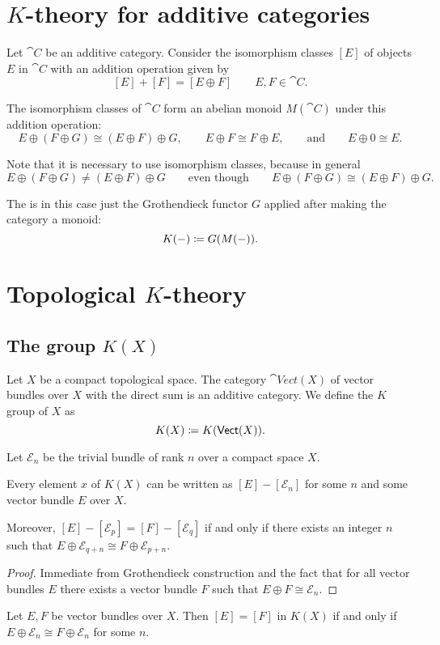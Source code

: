 \chapter{$K$-theory for additive categories}
Let $\cat{C}$ be an additive category. Consider the isomorphism classes $[E]$ of objects $E$ in $\cat{C}$ with an addition operation given by
\[ [E]+[F] = [E\oplus F] \qquad E,F\in \cat{C}. \]
\begin{lemma}
The isomorphism classes of $\cat{C}$ form an abelian monoid $M(\cat{C})$ under this addition operation:
\[ E\oplus (F\oplus G) \cong (E\oplus F)\oplus G, \qquad  E\oplus F \cong F\oplus E, \qquad \text{and}\qquad E\oplus 0 \cong E. \]
\end{lemma}
Note that it is necessary to use isomorphism classes, because in general
\[ E\oplus (F\oplus G) \neq (E\oplus F)\oplus G \qquad \text{even though} \qquad E\oplus (F\oplus G) \cong (E\oplus F)\oplus G. \]
\begin{definition}
The  is in this case just the Grothendieck functor $G$ applied after making the category a monoid:
\[ K(-) \coloneqq G(M(-)). \]
\end{definition}


\chapter{Topological $K$-theory}
\section{The group $K(X)$}
\begin{definition}
Let $X$ be a compact topological space. The category $\cat{Vect}(X)$ of vector bundles over $X$ with the direct sum is an additive category. We define the $K$ group of $X$ as
\[ K(X) \coloneqq K(\mathsf{Vect}(X)). \] 
\end{definition}
Let $\mathcal{E}_n$ be the trivial bundle of rank $n$ over a compact space $X$.
\begin{proposition}
Every element $x$ of $K(X)$ can be written as $[E]-[\mathcal{E}_n]$ for some $n$ and some vector bundle $E$ over $X$.

Moreover, $[E]-[\mathcal{E}_p]=[F]-[\mathcal{E}_q]$ \textup{if and only if} there exists an integer $n$ such that $E\oplus\mathcal{E}_{q+n}\cong F\oplus\mathcal{E}_{p+n}$.
\end{proposition}
\begin{proof}
Immediate from Grothendieck construction and the fact that for all vector bundles $E$ there exists a vector bundle $F$ such that $E\oplus F \cong \mathcal{E}_n$.
\end{proof}
\begin{corollary}
Let $E,F$ be vector bundles over $X$. Then $[E]=[F]$ in $K(X)$ \textup{if and only if} $E\oplus \mathcal{E}_n \cong F\oplus \mathcal{E}_n$ for some $n$.
\end{corollary}

